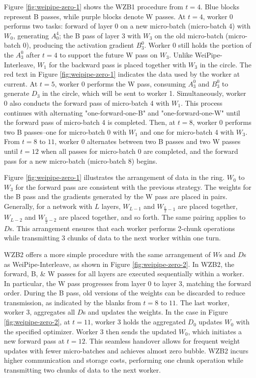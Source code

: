 \documentclass[sigplan,screen]{acmart}
\begin{document}
Figure \ref{fig:weipipe-zero-1} shows the WZB1 procedure from $t=4$. Blue blocks represent B passes, while purple blocks denote W passes. At $t=4$, worker 0 performs two tasks: forward of layer 0 on a new micro-batch (micro-batch 4) with $W_0$, generating $A_0^4$; the B pass of layer 3 with $W_3$ on the old micro-batch (micro-batch 0), producing the activation gradient $B_3^0$. Worker 0 still holds the portion of the $A_3^0$ after $t=4$ to support the future W pass on $W_3$. Unlike WeiPipe-Interleave, $W_1$ for the backward pass is placed together with $W_3$ in the circle. The red text in Figure \ref{fig:weipipe-zero-1} indicates the data used by the worker at current. At $t=5$, worker 0 performs the W pass, consuming $A_3^0$ and $B_3^0$ to generate $D_3$ in the circle, which will be sent to worker 1. Simultaneously, worker 0 also conducts the forward pass of micro-batch 4 with $W_1$. This process continues with alternating "one-forward-one-B" and "one-forward-one-W" until the forward pass of micro-batch 4 is completed. Then, at $t=8$, worker 0 performs two B passes--one for micro-batch 0 with $W_1$ and one for micro-batch 4 with $W_3$. From $t=8$ to $11$, worker 0 alternates between two B passes and two W passes until $t=12$ when all passes for micro-batch 0 are completed, and the forward pass for a new micro-batch (micro-batch 8) begins. 

Figure \ref{fig:weipipe-zero-1} illustrates the arrangement of data in the ring. $W_0$ to $W_3$ for the forward pass are consistent with the previous strategy. The weights for the B pass and the gradients generated by the W pass are placed in pairs. Generally, for a network with $L$ layers, $W_{L-1}$ and $W_{\frac{L}{2} -1}$ are placed together, $W_{L-2}$ and $W_{\frac{L}{2} -2}$ are placed together, and so forth. The same pairing applies to $D$s. This arrangement ensures that each worker performs 2-chunk operations while transmitting 3 chunks of data to the next worker within one turn.


WZB2 offers a more simple procedure with the same arrangement of $W$s and $D$s as WeiPipe-Interleave, as shown in Figure \ref{fig:weipipe-zero-2}. In WZB2, the forward, B, \& W passes for all layers are executed sequentially within a worker. In particular, the W pass progresses from layer 0 to layer 3, matching the forward order. During the B pass, old versions of the weights can be discarded to reduce transmission, as indicated by the blanks from $t=8$ to $11$. The last worker, worker 3, aggregates all $D$s and updates the weights. In the case in Figure \ref{fig:weipipe-zero-2}, at $t=11$, worker 3 holds the aggregated $D_0$ updates $W_0$ with the specified optimizer. Worker 3 then sends the updated $W_0$, which initiates a new forward pass at $t=12$. This seamless handover allows for frequent weight updates with fewer micro-batches and achieves almost zero bubble. WZB2 incurs higher communication and storage costs, performing one chunk operation while transmitting two chunks of data to the next worker.
\end{document}
